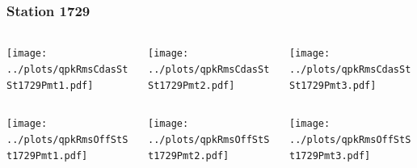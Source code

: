 \documentclass[aspectratio=169]{beamer}
\begin{document}
\begin{frame} 
  \frametitle{Station 1729}
  \begin{center}
    \begin{columns}
      \begin{column}{0.33\textwidth}
        \texttt{[image: ../plots/qpkRmsCdasStSt1729Pmt1.pdf]}
      \end{column}
      \begin{column}{0.33\textwidth}
        \texttt{[image: ../plots/qpkRmsCdasStSt1729Pmt2.pdf]}
      \end{column}
      \begin{column}{0.33\textwidth}
        \texttt{[image: ../plots/qpkRmsCdasStSt1729Pmt3.pdf]}
      \end{column}
    \end{columns}
  \end{center}

  \begin{center}
    \begin{columns}
      \begin{column}{0.33\textwidth}
        \texttt{[image: ../plots/qpkRmsOffStSt1729Pmt1.pdf]}
      \end{column}
      \begin{column}{0.33\textwidth}
        \texttt{[image: ../plots/qpkRmsOffStSt1729Pmt2.pdf]}
      \end{column}
      \begin{column}{0.33\textwidth}
        \texttt{[image: ../plots/qpkRmsOffStSt1729Pmt3.pdf]}
      \end{column}
    \end{columns}
  \end{center}
\end{frame}
\end{document}
